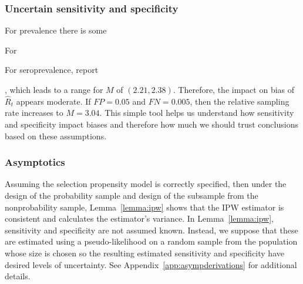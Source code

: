 \documentclass[12pt]{amsart}
\numberwithin{equation}{section}
\theoremstyle{plain}
\begin{document}

\subsubsection{Uncertain sensitivity and specificity}

For prevalence there is some

For

For seroprevalence, \cite{Bendavid2020} report



, which leads to a range for $M$ of $(2.21, 2.38)$.  Therefore, the impact on bias of $\hat R_t$ appears moderate.  If $FP = 0.05$ and $FN = 0.005$, then the relative sampling rate increases to $M=3.04$.  This simple tool helps us understand how sensitivity and specificity impact biases and  therefore how much we should trust conclusions based on these assumptions.


\subsubsection{Asymptotics}

Assuming the selection propensity model is correctly specified, then under the design of the probability sample and design of the subsample from the nonprobability sample, Lemma~\ref{lemma:ipw} shows that the IPW estimator is  consistent and calculates the estimator's variance.  In Lemma~\ref{lemma:ipw}, sensitivity and specificity are not assumed known.  Instead, we suppose that these are estimated using a pseudo-likelihood on a random sample from the population whose size is chosen so the resulting estimated sensitivity and specificity have desired levels of uncertainty.  See Appendix~\ref{app:asympderivations} for additional details.
\end{document}
